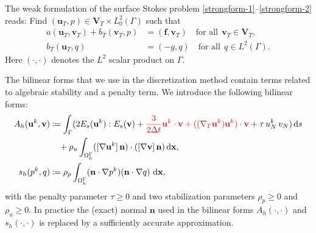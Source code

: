 \documentclass{article}
\newcommand{\vect}[1]{\boldsymbol{\mathbf{#1}}}
\newcommand{\bV}{\mathbf V}
\newcommand{\blf}{\mathbf f}
\newcommand{\bn}{\mathbf n}
\newcommand{\bu}{\mathbf u}
\newcommand{\bv}{\mathbf v}
\newcommand{\divG}{{\mathop{\,\rm div}}_{\Gamma}}
\newcommand{\OGamma}{\Omega^\Gamma_h}
\newcommand*\diff{\mathop{}\!\mathrm{d}}
\begin{document}
The weak  formulation of the surface Stokes problem \eqref{strongform-1}--\eqref{strongform-2}
reads: Find %
$(\bu_T,p) \in \bV_T \times L_0^2(\Gamma)$ %
such that
\begin{align}
	a(\bu_T,\bv_T) +b_T(\bv_T,p) &=(\blf,\bv_T) \quad \text{for all}~~\bv_T \in \bV_T, \label{Stokesweak1_1} \\
	b_T(\bu_T,q) & = (-g,q) \quad \text{for all}~~q \in L^2(\Gamma). \label{Stokesweak1_2}
\end{align}
Here $(\cdot,\cdot)$ denotes the $L^2$ scalar product on $\Gamma$.

The bilinear forms that we use in the discretization method contain terms related to algebraic stability and a penalty term. We introduce the following  bilinear forms:
\begin{align}\begin{split}\label{forms}
	A_h(\bu^k, \bv) &\coloneqq
		\int_{\Gamma} (2E_s(\bu^k) : E_s(\bv) + {\color{red}\frac{3}{2\Delta t}\bu^k\cdot \bv+ ((\nabla_\Gamma \mathbf{u}^k)\mathbf{u}^k)\cdot \bv} + \tau\,u_N^k\,v_N)  \diff{s} \\ & ~~~+
		\rho_u \int_{\Omega_h^{\Gamma}} ([\nabla\bu^k]\,\bn)\cdot([\nabla\bv]\,\bn) \diff{\vect x},\\
s_h(p^k,q)& \coloneqq  \rho_p  \int_{\OGamma} (\bn \cdot \nabla p^k)  (\bn \cdot\nabla q) \,  \diff{\vect x},
\end{split}\end{align}
with the penalty parameter $\tau \geq 0$ and two stabilization parameters $\rho_p  \geq 0$ and $\rho_u \geq 0$. In  practice the (exact) normal $\bn$ used in the bilinear forms $A_h(\cdot,\cdot)$ and $s_h(\cdot,\cdot)$ is replaced by a sufficiently accurate approximation. %
\end{document}

